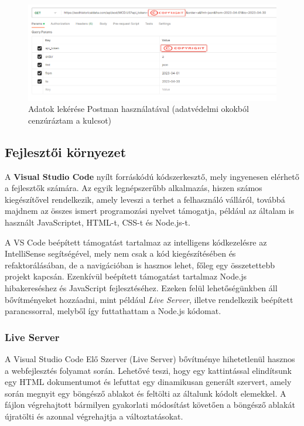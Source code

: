 \begin{figure}[h]
\centering
\includegraphics[scale=0.5]{images/postman.png}
\caption{Adatok lekérése Postman használatával (adatvédelmi okokból cenzúráztam a kulcsot)}
\label{fig:postman}
\end{figure}

\pagebreak

\subsection{Fejlesztői környezet }

A \textbf{Visual Studio Code} nyílt forráskódú kódszerkesztő, mely ingyenesen elérhető a fejlesztők számára. Az egyik legnépszerűbb alkalmazás, hiszen számos kiegészítővel rendelkezik, amely leveszi a terhet a felhasználó válláról, továbbá majdnem az összes ismert programozási nyelvet támogatja, például az általam is használt JavaScriptet, HTML-t, CSS-t és Node.js-t. 

A VS Code beépített támogatást tartalmaz az intelligens kódkezelésre az IntelliSense segítségével, mely nem csak a kód kiegészítésében és refaktorálásában, de a navigációban is hasznos lehet, főleg egy összetettebb projekt kapcsán. Ezenkívül beépített támogatást tartalmaz Node.js hibakereséshez és JavaScript fejlesztéséhez. Ezeken felül lehetőségünkben áll bővítményeket hozzáadni, mint például \emph{Live Server}, illetve rendelkezik beépített parancssorral, melyből így futtathattam a Node.js kódomat. \cite{vsc}

\subsubsection{Live Server}

A Visual Studio Code Elő Szerver (Live Server) bővítménye hihetetlenül hasznos a webfejlesztés folyamat során. Lehetővé teszi, hogy egy kattintással elindítsunk egy HTML dokumentumot és lefuttat egy dinamikusan generált szervert, amely során megnyit egy böngésző ablakot és feltölti az általunk kódolt elemekkel. A fájlon végrehajtott bármilyen gyakorlati módosítást követően a böngésző ablakát újratölti és azonnal végrehajtja a változtatásokat. 

